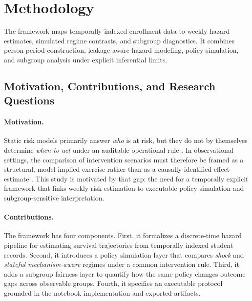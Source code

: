 \section{Methodology}

The framework maps temporally indexed enrollment data to weekly hazard estimates, simulated regime contrasts, and subgroup diagnostics. It combines person-period construction, leakage-aware hazard modeling, policy simulation, and subgroup analysis under explicit inferential limits.

\subsection{Motivation, Contributions, and Research Questions}

\paragraph*{Motivation.}
Static risk models primarily answer \textit{who} is at risk, but they do not by themselves determine \textit{when to act} under an auditable operational rule \cite{Prenkaj2021SurveyMLDropout,AndradeGiron2023DropoutMLReview}. In observational settings, the comparison of intervention scenarios must therefore be framed as a structural, model-implied exercise rather than as a causally identified effect estimate \cite{Connolly2018TrialsEvidenceBased,Gallagher2020ChallengeBased,Sidiropoulos2022AgencySustainability,Igelstrom2022CausalInferenceObs,DoutreligneVaroquaux2025PredictiveDecisionCausal}. This study is motivated by that gap: the need for a temporally explicit framework that links weekly risk estimation to executable policy simulation and subgroup-sensitive interpretation.

\paragraph*{Contributions.}
The framework has four components. First, it formalizes a discrete-time hazard pipeline for estimating survival trajectories from temporally indexed student records. Second, it introduces a policy simulation layer that compares \textit{shock} and \textit{stateful mechanism-aware} regimes under a common intervention rule. Third, it adds a subgroup fairness layer to quantify how the same policy changes outcome gaps across observable groups. Fourth, it specifies an executable protocol grounded in the notebook implementation and exported artifacts.

